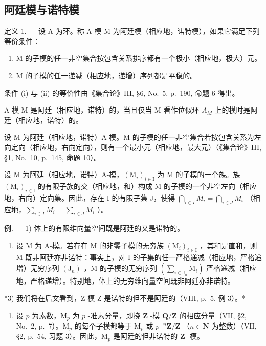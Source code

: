 \subsection{阿廷模与诺特模}

定义 1. --- 设 A 为环。称 A-模 M 为阿廷模（相应地，诺特模），如果它满足下列等价条件：

\begin{enumerate}
\def\labelenumi{(\roman{enumi})}
\item
  M 的子模的任一非空集合按包含关系排序都有一个极小（相应地，极大）元。
\item
  M 的子模的任一递减（相应地，递增）序列都是平稳的。
\end{enumerate}

条件 (i) 与 (ii) 的等价性由《集合论》III, §6, No.~5, p.~190, 命题 6 得出。

A-模 M 是阿廷（相应地，诺特）的，当且仅当 M 看作位似环 \(A_{M}\) 上的模时是阿廷（相应地，诺特）的。

设 M 为阿廷（相应地，诺特）A-模。M 的子模的任一非空集合若按包含关系为左向定向（相应地，右向定向），则有一个最小元（相应地，最大元）（《集合论》III, §1, No.~10, p.~145, 命题 10）。

设 M 为阿廷（相应地，诺特）A-模，\((\mathrm{M}_{i})_{i\in\mathrm{I}}\) 为 M 的子模的一个族。族 \((\mathrm{M}_{i})_{i\in\mathrm{I}}\) 的有限子族的交（相应地，和）构成 M 的子模的一个非空左向（相应地，右向）定向集。因此，存在 I 的有限子集 J，使得 \(\bigcap_{i\in I}M_{i}=\bigcap_{i\in J}M_{i}\) （相应地，\(\sum_{i\in I}M_{i}=\sum_{i\in J}M_{i}\) ）。

例. --- 1) 体上的有限维向量空间既是阿廷的又是诺特的。

\begin{enumerate}
\def\labelenumi{\arabic{enumi})}
\setcounter{enumi}{1}
\tightlist
\item
  设 M 为 A-模。若存在 M 的非零子模的无穷族 \((\mathrm{M}_{i})_{i\in\mathrm{I}}\) ，其和是直和，则 M 既非阿廷亦非诺特：事实上，对 I 的子集的任一严格递减（相应地，严格递增）无穷序列 \((\mathrm{J}_{n})\) ，M 的子模的无穷序列 \((\sum_{i\in\mathrm{J}_{n}}\mathrm{M}_{i})\) 严格递减（相应地，严格递增）。特别地，体上的无穷维向量空间既非阿廷亦非诺特。
\end{enumerate}

*3) 我们将在后文看到，Z-模 Z 是诺特的但不是阿廷的（VIII, p.~5, 例 3）。*

\begin{enumerate}
\def\labelenumi{\arabic{enumi})}
\setcounter{enumi}{3}
\tightlist
\item
  设 \(p\) 为素数，\(\mathrm{M}_p\) 为 \(p\) -准素分量，即挠 \(\mathbf{Z}\) -模 \(\mathbf{Q} / \mathbf{Z}\) 的相应分量（VII, §2, No.~2, p.~7）。\(\mathrm{M}_p\) 的每个子模都等于 \(\mathrm{M}_p\) 或 \(p^{-n}\mathbf{Z} / \mathbf{Z}\) （\(n \in \mathbf{N}\) 为整数）（VII, §2, p.~54, 习题 3）。因此，\(\mathrm{M}_p\) 是阿廷的但非诺特的 \(\mathbf{Z}\) -模。
\end{enumerate}

